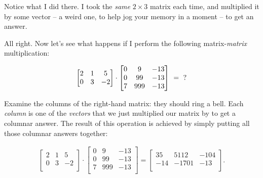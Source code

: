 \smallskip

Notice what I did there. I took the \textit{same} $2\times 3$ matrix each time,
and multiplied it by some vector -- a weird one, to help jog your memory in a
moment -- to get an answer.

All right. Now let's see what happens if I perform the following
matrix-\textit{matrix} multiplication:

\vspace{-.15in}
\begin{align*}
\begin{bmatrix}
2 & 1 & 5 \\
0 & 3 & -2 \\
\end{bmatrix} \cdot
\begin{bmatrix}
0 & 9 & -13 \\
0 & 99 & -13 \\
7 & 999 & -13 \\
\end{bmatrix} \ = \ {\LARGE ?}
\end{align*}
\vspace{-.15in}

Examine the columns of the right-hand matrix: they should ring a bell. Each
\textit{column} is one of the \textit{vectors} that we just multiplied our
matrix by to get a columnar answer. The result of this operation is achieved by
simply putting all those columnar answers together:

\vspace{-.15in}
\begin{align*}
\begin{bmatrix}
2 & 1 & 5 \\
0 & 3 & -2 \\
\end{bmatrix} \cdot
\begin{bmatrix}
0 & 9 & -13 \\
0 & 99 & -13 \\
7 & 999 & -13 \\
\end{bmatrix} =
\begin{bmatrix}
35 & 5112 & -104 \\
-14 & -1701 & -13 \\
\end{bmatrix}.
\end{align*}
\vspace{-.15in}


